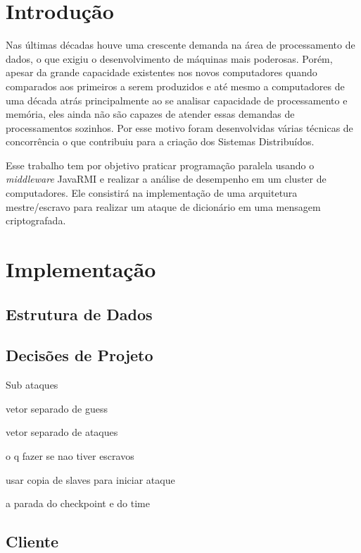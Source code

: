 \documentclass[
	12pt,				%
    oneside,			%
	a4paper,			%
	english,			%
	brazil,				%
	]{abntex2}
\begin{document}
\chapter{Introdução} 
Nas últimas décadas houve uma crescente demanda na área de processamento de dados, o que exigiu o desenvolvimento de máquinas
mais poderosas. Porém, apesar da grande capacidade existentes nos novos computadores quando comparados aos primeiros a serem produzidos e até mesmo a computadores de uma década atrás principalmente ao se analisar capacidade de processamento e memória, eles ainda não são capazes de atender essas demandas de processamentos sozinhos. Por esse motivo foram desenvolvidas várias técnicas de concorrência o que contribuiu para a criação dos Sistemas Distribuídos.


Esse trabalho tem por objetivo praticar programação paralela usando o \textit{middleware} JavaRMI e realizar a análise de desempenho em um cluster de computadores. Ele consistirá na implementação de uma arquitetura mestre/escravo para realizar um ataque de dicionário em uma mensagem criptografada.


\chapter{Implementação} 


\section{Estrutura de Dados}

\section{Decisões de Projeto}
Sub ataques

vetor separado de guess

vetor separado de ataques

o q fazer se nao tiver escravos

usar copia de slaves para iniciar ataque

a parada do checkpoint e do time


\section{Cliente}
\end{document}
